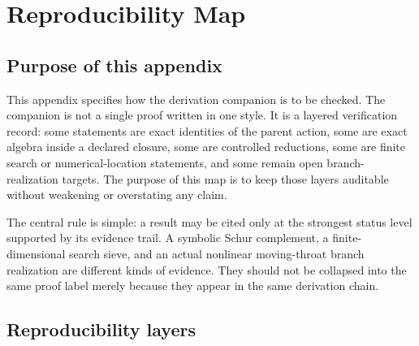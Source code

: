 \chapter{Reproducibility Map}
\label{app:reproducibility-map}
\def\ReproFile#1{\begingroup\footnotesize\nolinkurl{#1}\endgroup}

\section{Purpose of this appendix}
\label{sec:reproducibility-purpose}

This appendix specifies how the derivation companion is to be checked.  The companion is not a single proof written in one style.  It is a layered verification record: some statements are exact identities of the parent action, some are exact algebra inside a declared closure, some are controlled reductions, some are finite search or numerical-location statements, and some remain open branch-realization targets.  The purpose of this map is to keep those layers auditable without weakening or overstating any claim.

The central rule is simple: a result may be cited only at the strongest status level supported by its evidence trail.  A symbolic Schur complement, a finite-dimensional search sieve, and an actual nonlinear moving-throat branch realization are different kinds of evidence.  They should not be collapsed into the same proof label merely because they appear in the same derivation chain.

\section{Reproducibility layers}
\label{sec:reproducibility-layers}

